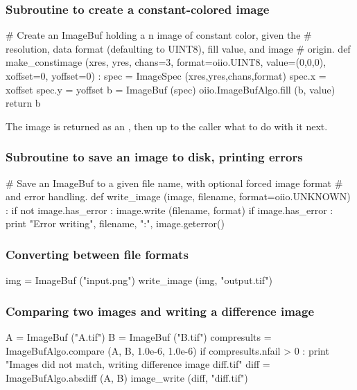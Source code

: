 \subsubsection*{Subroutine to create a constant-colored image}
\begin{code}
    # Create an ImageBuf holding a n image of constant color, given the
    # resolution, data format (defaulting to UINT8), fill value, and image
    # origin.
    def make_constimage (xres, yres, chans=3, format=oiio.UINT8, value=(0,0,0),
                         xoffset=0, yoffset=0) :
        spec = ImageSpec (xres,yres,chans,format)
        spec.x = xoffset
        spec.y = yoffset
        b = ImageBuf (spec)
        oiio.ImageBufAlgo.fill (b, value)
        return b
\end{code}

\noindent The image is returned as an \ImageBuf, then up to the caller 
what to do with it next.

\subsubsection*{Subroutine to save an image to disk, printing errors}
\begin{code}
    # Save an ImageBuf to a given file name, with optional forced image format
    # and error handling.
    def write_image (image, filename, format=oiio.UNKNOWN) :
        if not image.has_error :
            image.write (filename, format)
        if image.has_error :
            print "Error writing", filename, ":", image.geterror()
\end{code}


\subsubsection*{Converting between file formats}

\begin{code}
    img = ImageBuf ("input.png")
    write_image (img, "output.tif")
\end{code}


\subsubsection*{Comparing two images and writing a difference image}

\begin{code}
    A = ImageBuf ("A.tif")
    B = ImageBuf ("B.tif")
    compresults = ImageBufAlgo.compare (A, B, 1.0e-6, 1.0e-6)
    if compresults.nfail > 0 :
        print "Images did not match, writing difference image diff.tif"
        diff = ImageBufAlgo.absdiff (A, B)
        image_write (diff, "diff.tif")
\end{code}


